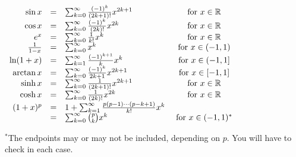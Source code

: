 \documentclass[12pt, addpoints]{exam/exam}
\newcommand{\1}{^{-1}}
\newcommand{\R}{\mathbb R}
\theoremstyle{plain}
\begin{document}
\begin{coverpages}
$
\begin{array}{r c l c}
\sin x &=& \sum_{k=0}^{\infty}\frac{(-1)^k}{(2k+1)!}x^{2k+1} & \text{ for }x\in\R \\
\cos x &=& \sum_{k=0}^{\infty}\frac{(-1)^k}{(2k)!}x^{2k} & \text{ for }x\in\R \\
e^x &=& \sum_{k=0}^{\infty}\frac{1}{k!}x^k & \text{ for }x\in\R \\
\frac{1}{1-x} &=& \sum_{k=0}^{\infty}x^k & \text{ for }x\in(-1,1) \\
\ln(1+x) &=& \sum_{k=1}^{\infty}\frac{(-1)^{k+1}}{k}x^k & \text{ for }x\in\left(-1,1\right] \\
\arctan x &=& \sum_{k=0}^{\infty}\frac{(-1)^k}{2k+1}x^{2k+1} & \text{ for }x\in[-1,1] \\
\sinh x &=& \sum_{k=0}^{\infty}\frac{1}{(2k+1)!}x^{2k+1} & \text{ for }x\in\R \\
\cosh x &=& \sum_{k=0}^{\infty}\frac{1}{(2k)!}x^{2k} & \text{ for }x\in\R \\
(1+x)^p &=& 1+\sum_{k=1}^{\infty}\frac{p(p-1)\cdots(p-k+1)}{k!}x^k & \\
 &=& \sum_{k=0}^{\infty}\binom{p}{k}x^k & \text{ for }x\in(-1,1)^*
\end{array}
$

$^*$The endpoints may or may not be included, depending on $p$.  You will have to check in each case.

\end{coverpages}
\end{document}
